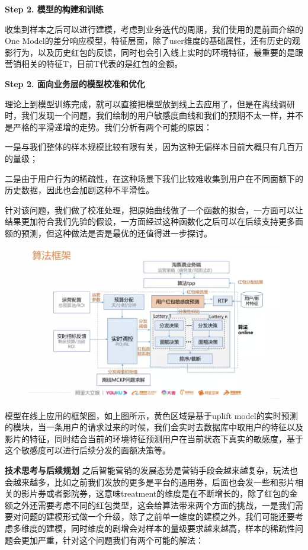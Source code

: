 \documentclass[12pt]{article}
\begin{document}
\textbf{ Step 2. 模型的构建和训练}

收集到样本之后可以进行建模，考虑到业务迭代的周期，我们使用的是前面介绍的One Model的差分响应模型，特征层面，除了user维度的基础属性，还有历史的观影行为，以及历史红包的反馈，同时也会引入线上实时的环境特征，最重要的是跟营销相关的特征T，目前T代表的是红包的金额。

\textbf{ Step 2. 面向业务层的模型校准和优化}

理论上到模型训练完成，就可以直接把模型放到线上去应用了，但是在离线调研时，我们发现一个问题，我们绘制的用户敏感度曲线和我们的预期不太一样，并不是严格的平滑递增的走势。我们分析有两个可能的原因：

一是与我们整体的样本规模比较有限有关，因为这种无偏样本目前大概只有几百万的量级；

二是由于用户行为的稀疏性，在这种场景下我们比较难收集到用户在不同面额下的历史数据，因此也会加剧这种不平滑性。

针对该问题，我们做了校准处理，把原始曲线做了一个函数的拟合，一方面可以让结果更加符合我们先验的假设，一方面经过这种函数化之后可以在后续支持更多面额的预测，但这种做法是否是最优的还值得进一步探讨。

\begin{figure}[H]
    \centering
    \includegraphics[width=1\textwidth]{fig/CasualInference-Uplift-Model-In-Ali4.png}
\end{figure}

模型在线上应用的框架图，如上图所示，黄色区域是基于uplift model的实时预测的模块，当一条用户的请求过来的时候，我们会实时去数据库中取用户的特征以及影片的特征，同时结合当前的环境特征预测用户在当前状态下真实的敏感度，基于这个敏感度可以进行后续分发的面额决策等。

\textbf{技术思考与后续规划}
之后智能营销的发展态势是营销手段会越来越复杂，玩法也会越来越多，比如之前我们发放的更多是平台的通用券，后面也会发一些和影片相关的影片券或者影院券，这意味treatment的维度是在不断增长的，除了红包的金额之外还需要考虑不同的红包类型，这会给算法带来两个方面的挑战，一是我们需要对问题的建模形式做一个升级，除了之前单一维度的建模之外，我们可能还要考虑多维度的建模，同时维度的剧增会对样本的量级要求越来越高，样本的稀疏性问题会更加严重，针对这个问题我们有两个可能的解法：
\end{document}
